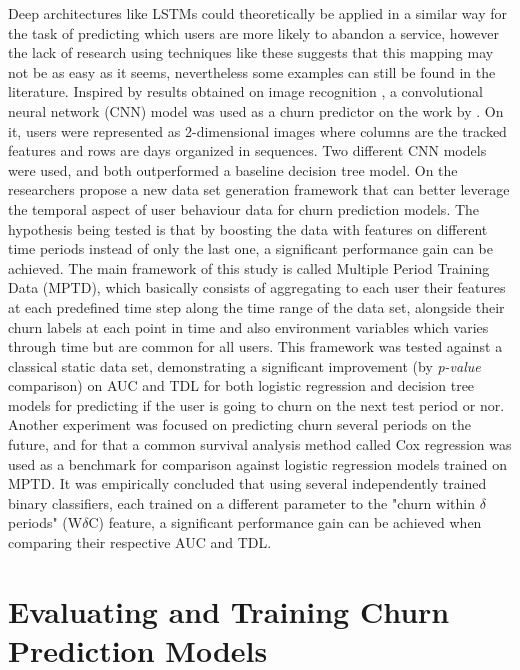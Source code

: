 \documentclass{kththesis}
\begin{document}
Deep architectures like LSTMs could theoretically be applied in a similar way for the task of predicting which users are more likely to abandon a service, however the lack of research using techniques like these suggests that this mapping may not be as easy as it seems, nevertheless some examples can still be found in the literature. Inspired by results obtained on image recognition \citep{krizhevsky2012imagenet}, a convolutional neural network (CNN) model was used as a churn predictor on the work by \citep{Wangperawong2016}. On it, users were represented as 2-dimensional images where columns are the tracked features and rows are days organized in sequences. Two different CNN models were used, and both outperformed a baseline decision tree model. On \citep{GurAli2014} the researchers propose a new data set generation framework that can better leverage the temporal aspect of user behaviour data for churn prediction models. The hypothesis being tested is that by boosting the data with features on different time periods instead of only the last one, a significant performance gain can be achieved. The main framework of this study is called Multiple Period Training Data (MPTD), which basically consists of aggregating to each user their features at each predefined time step along the time range of the data set, alongside their churn labels at each point in time and also environment variables which varies through time but are common for all users. This framework was tested against a classical static data set, demonstrating a significant improvement (by \emph{p-value} comparison) on AUC and TDL for both logistic regression and decision tree models for predicting if the user is going to churn on the next test period or nor. Another experiment was focused on predicting churn several periods on the future, and for that a common survival analysis method called Cox regression was used as a benchmark for comparison against logistic regression models trained on MPTD. It was empirically concluded that using several independently trained binary classifiers, each trained on a different parameter to the "churn within $\delta$ periods" (W$\delta$C) feature, a significant performance gain can be achieved when comparing their respective AUC and TDL.


\section{Evaluating and Training Churn Prediction Models}
\end{document}
